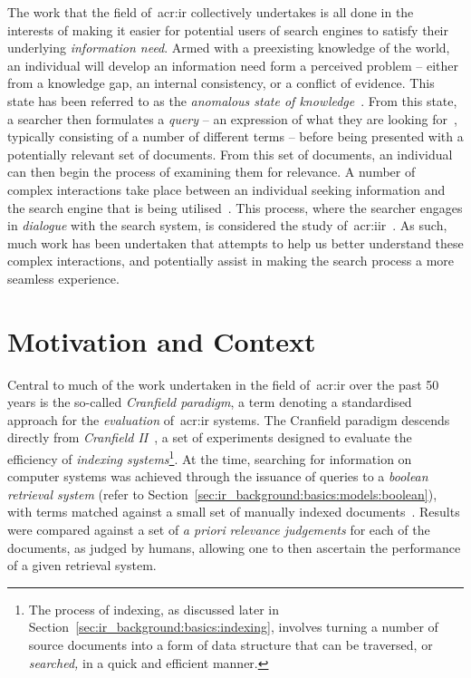 The work that the field of~\gls{acr:ir} collectively undertakes is all done in the interests of making it easier for potential users of search engines to satisfy their underlying \emph{information need}. Armed with a preexisting knowledge of the world, an individual will develop an information need form a perceived problem -- either from a knowledge gap, an internal consistency, or a conflict of evidence. This state has been referred to as the \emph{anomalous state of knowledge}~\citep{belkin1980ask}. From this state, a searcher then formulates a \emph{query} -- an expression of what they are looking for~\citep{borlund2003iir_model}, typically consisting of a number of different terms -- before being presented with a potentially relevant set of documents. From this set of documents, an individual can then begin the process of examining them for relevance. A number of complex interactions take place between an individual seeking information and the search engine that is being utilised~\citep{ingwersen2005theturn}. This process, where the searcher engages in \emph{dialogue} with the search system, is considered the study of~\gls{acr:iir}~\citep{borlund2003iir_model}. As such, much work has been undertaken that attempts to help us better understand these complex interactions, and potentially assist in making the search process a more seamless experience.

\section{Motivation and Context}\label{sec:intro:motivation}
Central to much of the work undertaken in the field of~\gls{acr:ir} over the past 50 years is the so-called \emph{Cranfield paradigm}, a term denoting a standardised approach for the \emph{evaluation} of~\gls{acr:ir} systems. The Cranfield paradigm descends directly from \emph{Cranfield II}~\citep{aslib1966factors}, a set of experiments designed to evaluate the efficiency of \emph{indexing systems}\footnote{The process of indexing, as discussed later in Section~\ref{sec:ir_background:basics:indexing}, involves turning a number of source documents into a form of data structure that can be traversed, or \emph{searched,} in a quick and efficient manner.}. At the time, searching for information on computer systems was achieved through the issuance of queries to a \emph{boolean retrieval system} (refer to Section~\ref{sec:ir_background:basics:models:boolean}), with terms matched against a small set of manually indexed documents~\citep{harman2010cranfield}. Results were compared against a set of \emph{a priori} \emph{relevance judgements} for each of the documents, as judged by humans, allowing one to then ascertain the performance of a given retrieval system.

